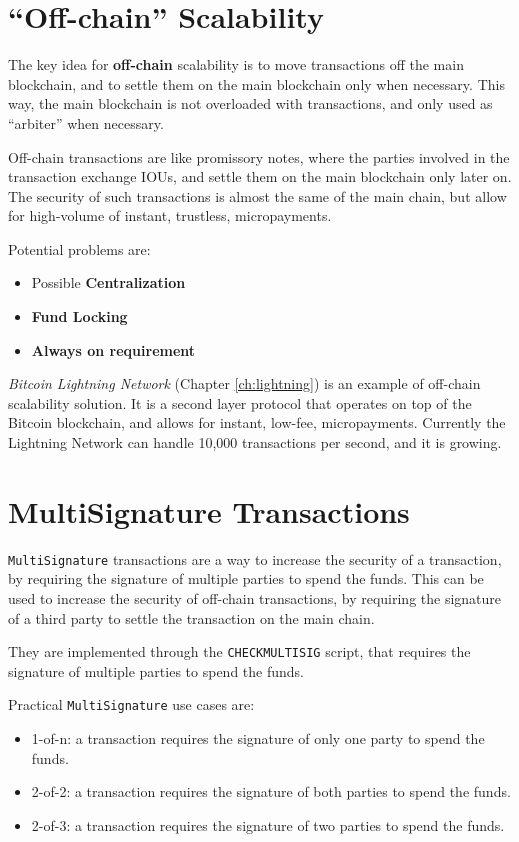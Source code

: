 \section{``Off-chain'' Scalability}
The key idea for \textbf{off-chain} scalability is to move transactions off the main blockchain, and to settle them on the main blockchain only when necessary. This way, the main blockchain is not overloaded with transactions, and only used as ``arbiter'' when necessary.

Off-chain transactions are like promissory notes, where the parties involved in the transaction exchange IOUs, and settle them on the main blockchain only later on.
The security of such transactions is almost the same of the main chain, but allow for high-volume of instant, trustless, micropayments.

Potential problems are:
\begin{itemize}
   \item Possible \textbf{Centralization}
   \item \textbf{Fund Locking}
   \item \textbf{Always on requirement}
\end{itemize}

\textit{Bitcoin Lightning Network} (Chapter \ref{ch:lightning}) is an example of off-chain scalability solution. It is a second layer protocol that operates on top of the Bitcoin blockchain, and allows for instant, low-fee, micropayments.
Currently the Lightning Network can handle 10,000 transactions per second, and it is growing.

\section{MultiSignature Transactions}
\texttt{MultiSignature} transactions are a way to increase the security of a transaction, by requiring the signature of multiple parties to spend the funds. This can be used to increase the security of off-chain transactions, by requiring the signature of a third party to settle the transaction on the main chain.

They are implemented through the \texttt{CHECKMULTISIG} script, that requires the signature of multiple parties to spend the funds.

Practical \texttt{MultiSignature} use cases are:
\begin{itemize}
   \item 1-of-n: a transaction requires the signature of only one party to spend the funds.
   \item 2-of-2: a transaction requires the signature of both parties to spend the funds.
   \item 2-of-3: a transaction requires the signature of two parties to spend the funds.
\end{itemize}

